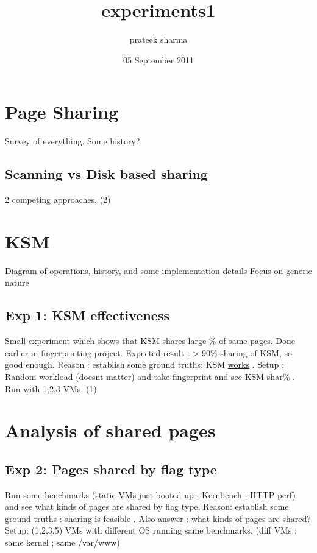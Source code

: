 \documentclass[11pt]{article}
\begin{document}
\title{experiments1}
\author{prateek sharma}
\date{05 September 2011}
\maketitle

\setcounter{tocdepth}{3}
\tableofcontents
\vspace*{1cm}

\section{Page Sharing}
\label{sec-1}

Survey of everything. Some history?
\subsection{Scanning vs Disk based sharing}
\label{sec-1_1}

2 competing approaches.
   (2)
\section{KSM}
\label{sec-2}

Diagram of operations, history, and some implementation details
Focus on generic nature
\subsection{Exp 1: KSM effectiveness}
\label{sec-2_1}

Small experiment which shows that KSM shares large \% of same pages. Done earlier in fingerprinting project.
Expected result : > 90\% sharing of KSM, so good enough.
Reason : establish some ground truths: KSM \underline{works} .
Setup : Random workload (doesnt matter) and take fingerprint and see KSM shar\% . Run with 1,2,3 VMs.
   (1)
\section{Analysis of shared pages}
\label{sec-3}
\subsection{Exp 2: Pages shared by flag type}
\label{sec-3_1}

Run some benchmarks (static VMs just booted up ; Kernbench ; HTTP-perf) and see what kinds of pages are shared by flag type.
Reason: establish some ground truths : sharing is \underline{feasible} . Also answer : what \underline{kinds} of pages are shared?
Setup: (1,2,3,5) VMs with different OS running same benchmarks. (diff VMs ; same kernel ; same /var/www) 
\end{document}
